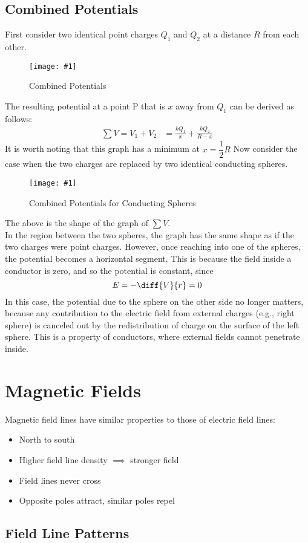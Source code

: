 \documentclass[a4paper,12pt]{article}
\let\oldsection\section
\renewcommand\section{\clearpage\oldsection}
\newcommand{\lb}{\\[8pt]}
\newcommand{\img}[4]{\begin{center}
  \begin{figure}[H]
    \centering
    \texttt{[image: \#1]}
    \caption{#3}
    \label{fig:#4}
  \end{figure}
\end{center}}
\begin{document}
\pagebreak

\subsection{Combined Potentials}

First consider two identical point charges $Q_1$ and $Q_2$ at a distance $R$ from each other.
\img{combined.png}{0.9}{Combined Potentials}{combined}
The resulting potential at a point P that is $x$ away from $Q_1$ can be derived as follows:
\begin{align*}
  \sum V = V_1 + V_2 & = \frac{kQ_1}{x} + \frac{kQ_2}{R - x}
\end{align*}
It is worth noting that this graph has a minimum at $x = \dfrac{1}{2} R$
Now consider the case when the two charges are replaced by two identical conducting spheres.
\img{combinedhollow.png}{0.9}{Combined Potentials for Conducting Spheres}{combinedhollow}
The above is the shape of the graph of $\sum V$.\lb
In the region between the two spheres, the graph has the same shape as if the two charges were point charges. However, once reaching into one of the spheres, the potential becomes a horizontal segment. This is because the field inside a conductor is zero, and so the potential is constant, since $$E = -\diff{V}{r} = 0$$
In this case, the potential due to the sphere on the other side no longer matters, because any contribution to the electric field from external charges (e.g., right sphere) is canceled out by the redistribution of charge on the surface of the left sphere. This is a property of conductors, where external fields cannot penetrate inside.

\section{Magnetic Fields}

Magnetic field lines have similar properties to those of electric field lines:
\begin{itemize}
  \item North to south
  \item Higher field line density $\implies$ stronger field
  \item Field lines never cross
  \item Opposite poles attract, similar poles repel
\end{itemize}

\subsection{Field Line Patterns}
\end{document}
